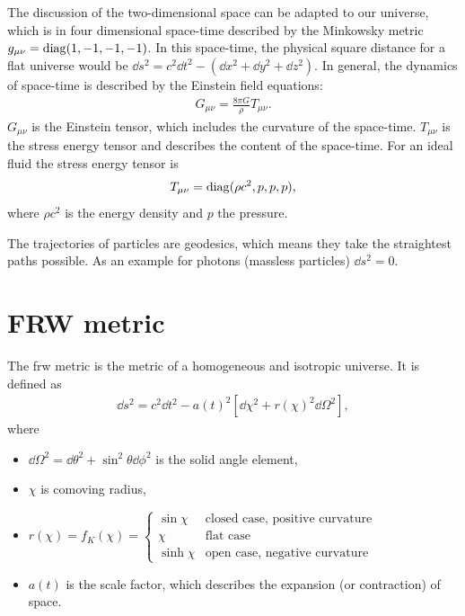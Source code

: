 The discussion of the two-dimensional space can be adapted to our universe, which is in four dimensional space-time described by the Minkowsky metric $g_{\mu\nu} = \operatorname{diag}(1, -1, -1, -1)$. In this space-time, the physical square distance for a flat universe would be $\dd{s}^2 = c^2\dd{t}^2- (\dd{x}^2 + \dd{y}^2 + \dd{z}^2)$. In general, the dynamics of space-time is described by the Einstein field equations:
\begin{align*}
	G_{\mu\nu} = \frac{8\pi G}{\rho} T_{\mu\nu}.
\end{align*}
$G_{\mu\nu}$ is the Einstein tensor, which includes the curvature of the space-time. $T_{\mu\nu}$ is the stress energy tensor and describes the content of the space-time. For an ideal fluid the stress energy tensor is
\begin{align*}
	T_{\mu\nu} = \operatorname{diag}(\rho c^2, p, p, p),
\end{align*}
where $\rho c^2$ is the energy density and $p$ the pressure. 

The trajectories of particles are geodesics, which means they take the straightest paths possible. As an example for photons (massless particles) $\dd{s}^2 = 0$.



\section{FRW metric}
The \ac{frw} metric is the metric of a homogeneous and isotropic universe.
It is defined as
\begin{align*}
  \dd{s}^2 = c^2 \dd{t}^2 - a(t)^2 \left[ \dd{\chi}^2 + r(\chi)^2 \dd{\Omega}^2 \right],
\end{align*}
where
\begin{itemize}[nolistsep]
	\item $\dd{\Omega}^2 = \dd{\theta}^2 + \sin^2\theta \dd{\phi}^2$ is the solid angle element,
	\item $\chi$ is comoving radius,
	\item $\displaystyle
		r(\chi) = f_K(\chi) = 
		\begin{cases}
			\sin \chi & \text{closed case, positive curvature}\\
			\chi & \text{flat case}\\
			\sinh \chi & \text{open case, negative curvature}
		\end{cases}
		$
	\item $a(t)$ is the scale factor, which describes the expansion (or contraction) of space.
\end{itemize}

